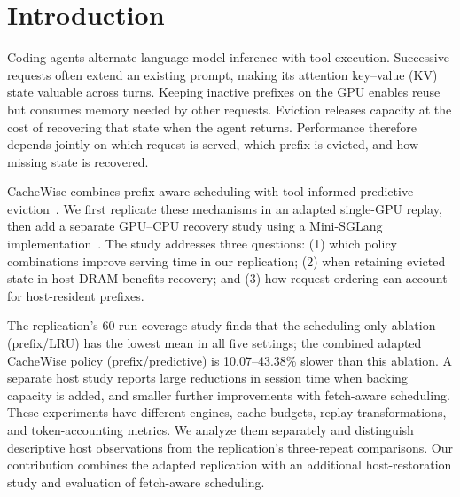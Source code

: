 \section{Introduction}
\label{sec:introduction}

Coding agents alternate language-model inference with tool execution.
Successive requests often extend an existing prompt, making its attention key--value (KV) state valuable across turns.
Keeping inactive prefixes on the GPU enables reuse but consumes memory needed by other requests.
Eviction releases capacity at the cost of recovering that state when the agent returns.
Performance therefore depends jointly on which request is served, which prefix is evicted, and how missing state is recovered.

CacheWise combines prefix-aware scheduling with tool-informed predictive eviction~\cite{Tiwari2026CacheWise}.
We first replicate these mechanisms in an adapted single-GPU replay, then add a separate GPU--CPU recovery study using a Mini-SGLang implementation~\cite{MiniSGLang2026Artifact}.
The study addresses three questions: (1) which policy combinations improve serving time in our replication; (2) when retaining evicted state in host DRAM benefits recovery; and (3) how request ordering can account for host-resident prefixes.

The replication's 60-run coverage study finds that the scheduling-only ablation (prefix/LRU) has the lowest mean in all five settings; the combined adapted CacheWise policy (prefix/predictive) is 10.07--43.38\% slower than this ablation.
A separate host study reports large reductions in session time when backing capacity is added, and smaller further improvements with fetch-aware scheduling.
These experiments have different engines, cache budgets, replay transformations, and token-accounting metrics.
We analyze them separately and distinguish descriptive host observations from the replication's three-repeat comparisons.
Our contribution combines the adapted replication with an additional host-restoration study and evaluation of fetch-aware scheduling.
